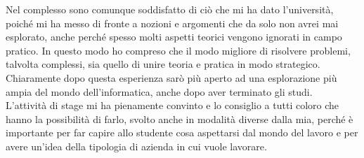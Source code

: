 Nel complesso sono comunque soddisfatto di ciò che mi ha dato l'università, poiché mi ha messo di fronte a nozioni e argomenti che da solo non avrei mai esplorato, anche perché spesso molti aspetti teorici vengono ignorati in campo pratico. In questo modo ho compreso che il modo migliore di risolvere problemi, talvolta complessi, sia quello di unire teoria e pratica in modo strategico. Chiaramente dopo questa esperienza sarò più aperto ad una esplorazione più ampia del mondo dell'informatica, anche dopo aver terminato gli studi. \\
L'attività di stage mi ha pienamente convinto e lo consiglio a tutti coloro che hanno la possibilità di farlo, svolto anche in modalità diverse dalla mia, perché è importante per far capire allo studente cosa aspettarsi dal mondo del lavoro e per avere un'idea della tipologia di azienda in cui vuole lavorare.
